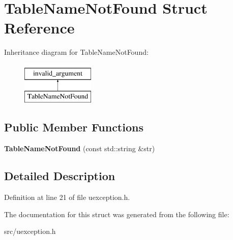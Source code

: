 \hypertarget{struct_table_name_not_found}{}\section{Table\+Name\+Not\+Found Struct Reference}
\label{struct_table_name_not_found}
Inheritance diagram for Table\+Name\+Not\+Found\+:\begin{figure}[H]
\begin{center}
\leavevmode
\includegraphics[height=2.000000cm]{struct_table_name_not_found}
\end{center}
\end{figure}
\subsection*{Public Member Functions}
\begin{DoxyCompactItemize}
\item 
\mbox{\label{struct_table_name_not_found_a19ad1a2f613641a309e7850db10f34aa}} 
{\bfseries Table\+Name\+Not\+Found} (const std\+::string \&str)
\end{DoxyCompactItemize}


\subsection{Detailed Description}


Definition at line 21 of file uexception.\+h.



The documentation for this struct was generated from the following file\+:\begin{DoxyCompactItemize}
\item 
src/uexception.\+h\end{DoxyCompactItemize}
